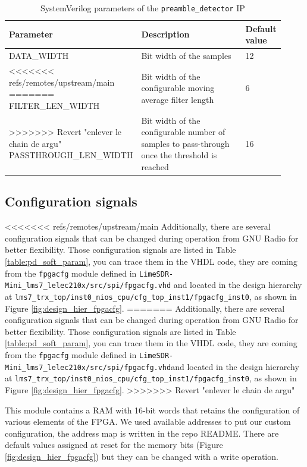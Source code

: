 \begin{table}[!h]
\centering
\begin{tabular}{|p{0.36\linewidth}|p{0.48\linewidth}|p{0.08\linewidth}|}
\hline
Parameter & Description & Default value \\
\hline
\textsc{DATA\_WIDTH} & Bit width of the samples & 12 \\
\hline
<<<<<<< refs/remotes/upstream/main
=======
\textsc{FILTER\_LEN\_WIDTH} & Bit width of the configurable moving average filter length & 6 \\
\hline
>>>>>>> Revert "enlever le chain de argu"
\textsc{PASSTHROUGH\_LEN\_WIDTH} & Bit width of the configurable number of samples to pass-through once the threshold is reached & 16 \\
\hline
\end{tabular}
\caption{SystemVerilog parameters of the \texttt{preamble\_detector} IP}
\label{table:pd_hard_param}
\end{table}

\subsection{Configuration signals}
\begin{sloppypar}
<<<<<<< refs/remotes/upstream/main
Additionally, there are several configuration signals that can be changed during operation from GNU Radio for better flexibility. Those configuration signals are listed in Table \ref{table:pd_soft_param}, you can trace them in the VHDL code, they are coming from the \texttt{fpgacfg} module defined in \texttt{LimeSDR-Mini\_lms7\_lelec210x/src/spi/fpgacfg.vhd} and located in the design hierarchy at \texttt{lms7\_trx\_top/inst0\_nios\_cpu/cfg\_top\_inst1/fpgacfg\_inst0}, as shown in Figure \ref{fig:design_hier_fpgacfg}.
=======
Additionally, there are several configuration signals that can be changed during operation from GNU Radio for better flexibility. Those configuration signals are listed in Table \ref{table:pd_soft_param}, you can trace them in the VHDL code, they are coming from the \texttt{fpgacfg} module defined in \texttt{LimeSDR-Mini\_lms7\_lelec210x/src/spi/fpgacfg.vhd}and located in the design hierarchy at \texttt{lms7\_trx\_top/inst0\_nios\_cpu/cfg\_top\_inst1/fpgacfg\_inst0}, as shown in Figure \ref{fig:design_hier_fpgacfg}.
>>>>>>> Revert "enlever le chain de argu"
\end{sloppypar}

This module contains a RAM with 16-bit words that retains the configuration of various elements of the FPGA. We used available addresses to put our custom configuration, the address map is written in the repo README. There are default values assigned at reset for the memory bits (Figure \ref{fig:design_hier_fpgacfg}) but they can be changed with a write operation.

